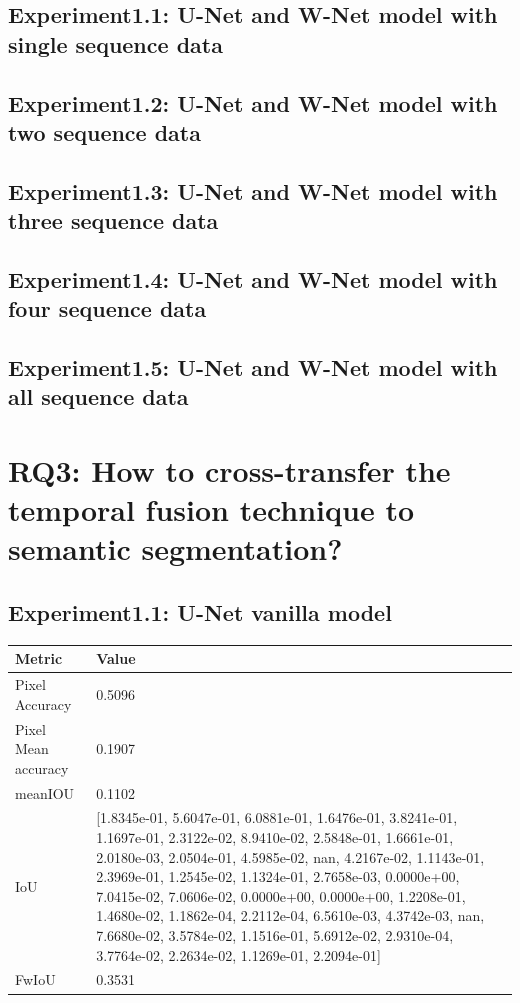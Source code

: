     \subsection{Experiment1.1: U-Net and W-Net model with single sequence data}
    \subsection{Experiment1.2: U-Net and W-Net model with two sequence data}
    \subsection{Experiment1.3: U-Net and W-Net model with three sequence data}
    \subsection{Experiment1.4: U-Net and W-Net model with four sequence data}
    \subsection{Experiment1.5: U-Net and W-Net model with all sequence data}
    \section{RQ3: How to cross-transfer the temporal fusion technique to semantic segmentation?}
    \subsection{Experiment1.1: U-Net vanilla model}
    
    
    \newpage 
    
    \begin{center}
    	\begin{tabular}{ | l | p{12cm} |}
    		\hline
    		
    		\cellcolor{purple!30}Metric & \cellcolor{purple!30}Value \\ \hline
    		Pixel Accuracy & 0.5096 \\ \hline
    		Pixel Mean accuracy & 0.1907  \\ \hline
    		meanIOU & 0.1102 \\ \hline
    		IoU & [1.8345e-01, 5.6047e-01, 6.0881e-01, 1.6476e-01, 3.8241e-01, 1.1697e-01, 
    		2.3122e-02, 8.9410e-02, 2.5848e-01, 1.6661e-01, 2.0180e-03, 2.0504e-01, 
    		4.5985e-02,        nan, 4.2167e-02, 1.1143e-01, 2.3969e-01, 1.2545e-02, 
    		1.1324e-01, 2.7658e-03, 0.0000e+00, 7.0415e-02, 7.0606e-02, 0.0000e+00,  
    		0.0000e+00, 1.2208e-01, 1.4680e-02, 1.1862e-04, 2.2112e-04, 6.5610e-03, 
    		4.3742e-03,        nan, 7.6680e-02, 3.5784e-02, 1.1516e-01, 5.6912e-02, 
    		2.9310e-04, 3.7764e-02, 2.2634e-02, 1.1269e-01, 2.2094e-01] \\ \hline
    		FwIoU & 0.3531 \\ \hline
    		\hline
    	\end{tabular}
    \end{center}
	
